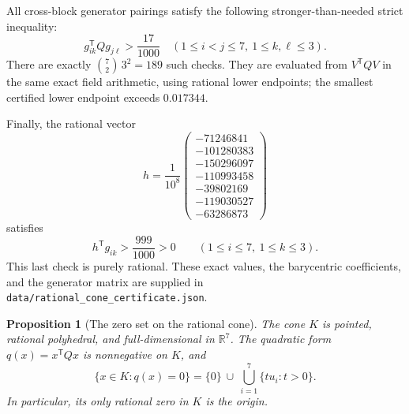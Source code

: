 \documentclass[11pt]{article}
\newtheorem{proposition}[theorem]{Proposition}
\theoremstyle{definition}
\newcommand{\R}{\mathbb R}
\newcommand{\trans}{^{\mathsf T}}
\numberwithin{equation}{section}
\begin{document}
All cross-block generator pairings satisfy the following stronger-than-needed
strict inequality:
\begin{equation}\label{eq:cross}
 g_{ik}\trans Qg_{j\ell}>\frac{17}{1000}
 \quad(1\leq i<j\leq7,\ 1\leq k,\ell\leq3).
\end{equation}
There are exactly $\binom72\,3^2=189$ such checks. They are evaluated from
$V\trans QV$ in the same exact field arithmetic, using rational lower
endpoints; the smallest certified lower endpoint exceeds $0.017344$.

Finally, the rational vector
\begin{equation}\label{eq:h}
 h=\frac1{10^8}
 \begin{pmatrix}
 -71246841\\-101280383\\-150296097\\-110993458\\
 -39802169\\-119030527\\-63286873
 \end{pmatrix}
\end{equation}
satisfies
\begin{equation}\label{eq:pointedcertificate}
 h\trans g_{ik}>\frac{999}{1000}>0
 \qquad(1\leq i\leq7,\ 1\leq k\leq3).
\end{equation}
This last check is purely rational. These exact values, the barycentric
coefficients, and the generator matrix are supplied in
\texttt{data/rational\_cone\_certificate.json}.

\begin{proposition}[The zero set on the rational cone]\label{prop:zeros}
The cone $K$ is pointed, rational polyhedral, and full-dimensional in $\R^7$.
The quadratic form $q(x)=x\trans Qx$ is nonnegative on $K$, and
\begin{equation}\label{eq:zeros}
 \{x\in K:q(x)=0\}
 =\{0\}\ \cup\ \bigcup_{i=1}^7\{t u_i:t>0\}.
\end{equation}
In particular, its only rational zero in $K$ is the origin.
\end{proposition}
\end{document}
